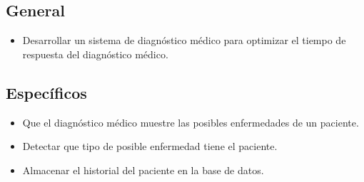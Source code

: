 \documentclass[preprint,12pt]{elsarticle}
\begin{document}
		\subsection{\textbf{ General }}
	 \begin{itemize}
		\item Desarrollar un sistema de diagnóstico médico para optimizar el tiempo  de respuesta del diagnóstico médico.
	 \end{itemize}
		\subsection{\textbf{Específicos }}
\begin{itemize}
	\item Que el diagnóstico médico muestre las posibles enfermedades de un paciente.
	\item Detectar que tipo de posible enfermedad tiene el paciente. 
	\item Almacenar el historial del paciente en la base de datos. 
	\end{itemize}
\end{document}

